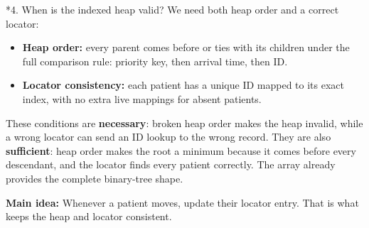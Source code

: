 \documentclass[11pt,a4paper]{article}
\makeatletter
\renewcommand\section{\@startsection{section}{1}{0pt}{10pt}{4pt}{\large\bfseries}}
\makeatother
\begin{document}
\section*{4. When is the indexed heap valid?}
We need both heap order and a correct locator:
\begin{itemize}
\item \textbf{Heap order:} every parent comes before or ties with its children
under the full comparison rule: priority key, then arrival time, then ID.
\item \textbf{Locator consistency:} each patient has a unique ID mapped to
its exact index, with no extra live mappings for absent patients.
\end{itemize}
These conditions are \textbf{necessary}: broken heap order makes the heap
invalid, while a wrong locator can send an ID lookup to the wrong record.
They are also \textbf{sufficient}: heap order makes the root a minimum
because it comes before every descendant, and the locator finds every
patient correctly. The array already provides the complete binary-tree shape.

\textbf{Main idea:} Whenever a patient moves, update their locator entry.
That is what keeps the heap and locator consistent.
\end{document}

